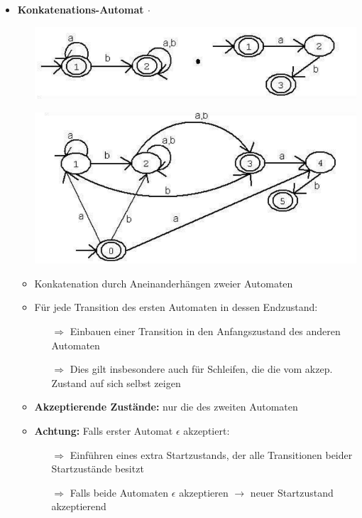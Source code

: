 \documentclass[11pt,a4paper]{article}
\begin{document}
\begin{itemize}
\begin{itemize}
	\end{itemize}
	
\item {\large \textbf{Konkatenations-Automat $\cdot$}}
	\begin{itemize}
	
	\item[]
		\begin{center}
		\includegraphics[width=12cm]{Bilder/konkat1}
		\end{center}			
	
	\item[]
		\begin{center}
		\includegraphics[width=12cm]{Bilder/konkat2}
		\end{center}	
	
	\item Konkatenation durch Aneinanderhängen zweier Automaten
	\item Für jede Transition des ersten Automaten in dessen Endzustand:
		\begin{itemize}
		\item[$\Rightarrow$] Einbauen einer Transition in den Anfangszustand des anderen Automaten
		\item[$\Rightarrow$] Dies gilt insbesondere auch für Schleifen, die die vom akzep. Zustand auf sich selbst zeigen
		\end{itemize}
	\item \textbf{Akzeptierende Zustände:} nur die des zweiten Automaten
	\item \textbf{Achtung:} Falls erster Automat $\epsilon$ akzeptiert:
		\begin{itemize}
		\item[$\Rightarrow$] Einführen eines extra Startzustands, der alle Transitionen beider Startzustände besitzt
		\item[$\Rightarrow$] Falls beide Automaten $\epsilon$ akzeptieren  $\rightarrow$ neuer Startzustand akzeptierend 
		\end{itemize}
		

\end{itemize}
\end{itemize}
\end{document}
